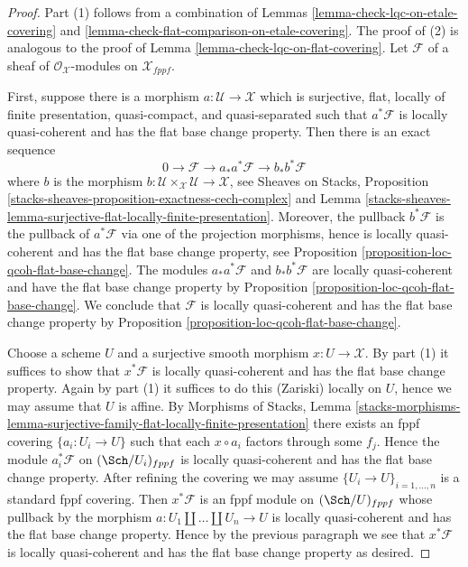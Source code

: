 \begin{proof}
Part (1) follows from a combination of
Lemmas \ref{lemma-check-lqc-on-etale-covering} and
\ref{lemma-check-flat-comparison-on-etale-covering}.
The proof of (2) is analogous to the proof of
Lemma \ref{lemma-check-lqc-on-flat-covering}.
Let $\mathcal{F}$ of a sheaf of $\mathcal{O}_\mathcal{X}$-modules
on $\mathcal{X}_{fppf}$.

\medskip\noindent
First, suppose there is a morphism $a : \mathcal{U} \to \mathcal{X}$
which is surjective, flat, locally of finite presentation, quasi-compact,
and quasi-separated such that $a^*\mathcal{F}$ is locally quasi-coherent
and has the flat base change property.
Then there is an exact sequence
$$
0 \to \mathcal{F} \to a_*a^*\mathcal{F} \to b_*b^*\mathcal{F}
$$
where $b$ is the morphism
$b : \mathcal{U} \times_\mathcal{X} \mathcal{U} \to \mathcal{X}$, see
Sheaves on Stacks, Proposition
\ref{stacks-sheaves-proposition-exactness-cech-complex} and
Lemma \ref{stacks-sheaves-lemma-surjective-flat-locally-finite-presentation}.
Moreover, the pullback $b^*\mathcal{F}$ is the pullback of $a^*\mathcal{F}$
via one of the projection morphisms, hence is locally quasi-coherent
and has the flat base change property, see
Proposition \ref{proposition-loc-qcoh-flat-base-change}.
The modules $a_*a^*\mathcal{F}$ and $b_*b^*\mathcal{F}$ are locally
quasi-coherent and have the flat base change property by
Proposition \ref{proposition-loc-qcoh-flat-base-change}.
We conclude that $\mathcal{F}$ is locally quasi-coherent and
has the flat base change property by
Proposition \ref{proposition-loc-qcoh-flat-base-change}.

\medskip\noindent
Choose a scheme $U$ and a surjective smooth morphism $x : U \to \mathcal{X}$.
By part (1) it suffices to show that $x^*\mathcal{F}$ is locally
quasi-coherent and has the flat base change property.
Again by part (1) it suffices to do this (Zariski) locally on $U$,
hence we may assume that $U$ is affine. By
Morphisms of Stacks, Lemma
\ref{stacks-morphisms-lemma-surjective-family-flat-locally-finite-presentation}
there exists an fppf covering $\{a_i : U_i \to U\}$ such that
each $x \circ a_i$ factors through some $f_j$. Hence the module
$a_i^*\mathcal{F}$ on $(\Sch/U_i)_{fppf}$
is locally quasi-coherent and has the flat base change property.
After refining the covering we may assume $\{U_i \to U\}_{i = 1, \ldots, n}$
is a standard fppf covering. Then $x^*\mathcal{F}$ is an fppf
module on $(\Sch/U)_{fppf}$ whose pullback by the morphism
$a : U_1 \amalg \ldots \amalg U_n \to U$ is locally quasi-coherent
and has the flat base change property.
Hence by the previous paragraph we see that $x^*\mathcal{F}$ is locally
quasi-coherent and has the flat base change property as desired.
\end{proof}

